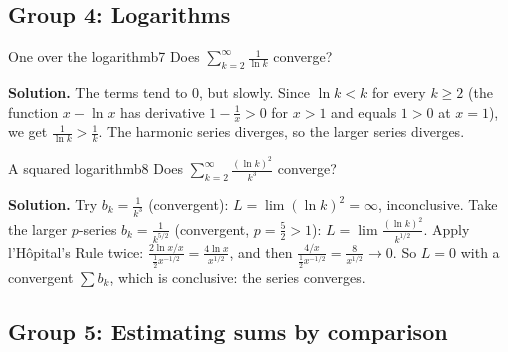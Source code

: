 \documentclass[11pt]{article}
\begin{document}
\subsection*{Group 4: Logarithms}

\begin{exmp}{One over the logarithm}{b7}
Does $\displaystyle\sum_{k=2}^\infty\frac1{\ln k}$ converge?

\textbf{Solution.} The terms tend to $0$, but slowly. Since $\ln k<k$ for every $k\ge2$ (the function $x-\ln x$ has derivative $1-\frac1x>0$ for $x>1$ and equals $1>0$ at $x=1$), we get $\frac1{\ln k}>\frac1k$. The harmonic series diverges, so the larger series diverges.
\end{exmp}

\begin{exmp}{A squared logarithm}{b8}
Does $\displaystyle\sum_{k=2}^\infty\frac{(\ln k)^2}{k^3}$ converge?

\textbf{Solution.} Try $b_k=\frac1{k^3}$ (convergent): $L=\lim(\ln k)^2=\infty$, inconclusive. Take the larger $p$-series $b_k=\frac1{k^{5/2}}$ (convergent, $p=\frac52>1$): $L=\lim\frac{(\ln k)^2}{k^{1/2}}$. Apply l'H\^opital's Rule twice: $\frac{2\ln x/x}{\frac12x^{-1/2}}=\frac{4\ln x}{x^{1/2}}$, and then $\frac{4/x}{\frac12x^{-1/2}}=\frac8{x^{1/2}}\to0$. So $L=0$ with a convergent $\sum b_k$, which is conclusive: the series converges.
\end{exmp}

\subsection*{Group 5: Estimating sums by comparison}
\end{document}
